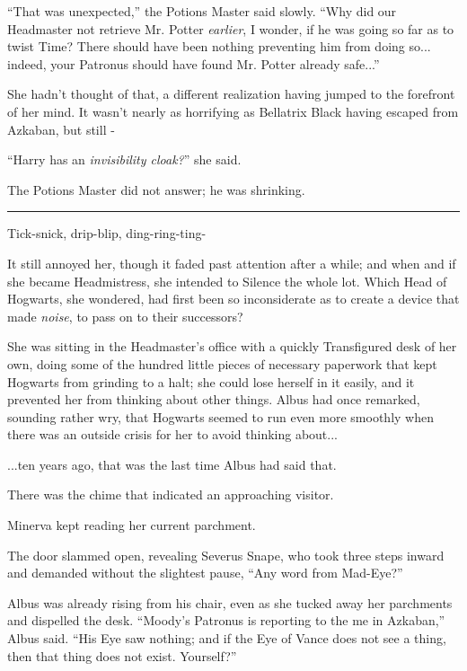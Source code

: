 ``That was unexpected,'' the Potions Master said slowly. ``Why did our Headmaster not retrieve Mr. Potter \emph{earlier}, I wonder, if he was going so far as to twist Time? There should have been nothing preventing him from doing so... indeed, your Patronus should have found Mr. Potter already safe...''

She hadn't thought of that, a different realization having jumped to the forefront of her mind. It wasn't nearly as horrifying as Bellatrix Black having escaped from Azkaban, but still -

``Harry has an \emph{invisibility cloak?}'' she said.

The Potions Master did not answer; he was shrinking.

\begin{center}\rule{3in}{0.4pt}\end{center}

Tick-snick, drip-blip, ding-ring-ting-

It still annoyed her, though it faded past attention after a while; and when and if she became Headmistress, she intended to Silence the whole lot. Which Head of Hogwarts, she wondered, had first been so inconsiderate as to create a device that made \emph{noise}, to pass on to their successors?

She was sitting in the Headmaster's office with a quickly Transfigured desk of her own, doing some of the hundred little pieces of necessary paperwork that kept Hogwarts from grinding to a halt; she could lose herself in it easily, and it prevented her from thinking about other things. Albus had once remarked, sounding rather wry, that Hogwarts seemed to run even more smoothly when there was an outside crisis for her to avoid thinking about...

...ten years ago, that was the last time Albus had said that.

There was the chime that indicated an approaching visitor.

Minerva kept reading her current parchment.

The door slammed open, revealing Severus Snape, who took three steps inward and demanded without the slightest pause, ``Any word from Mad-Eye?''

Albus was already rising from his chair, even as she tucked away her parchments and dispelled the desk. ``Moody's Patronus is reporting to the me in Azkaban,'' Albus said. ``His Eye saw nothing; and if the Eye of Vance does not see a thing, then that thing does not exist. Yourself?''

